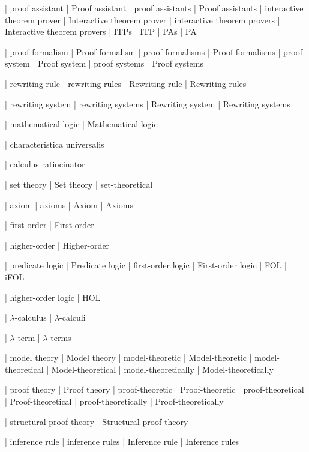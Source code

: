 
 | proof assistant
 | Proof assistant
 | proof assistants
 | Proof assistants
 | interactive theorem prover
 | Interactive theorem prover
 | interactive theorem provers
 | Interactive theorem provers
 | ITPs
 | ITP
 | PAs
 | PA

 | proof formalism
 | Proof formalism
 | proof formalisms
 | Proof formalisms
 | proof system
 | Proof system
 | proof systems
 | Proof systems

 | rewriting rule
 | rewriting rules
 | Rewriting rule
 | Rewriting rules

 | rewriting system
 | rewriting systems
 | Rewriting system
 | Rewriting systems

 | mathematical logic
 | Mathematical logic

 | characteristica universalis

 | calculus ratiocinator
 
 | set theory
 | Set theory
 | set-theoretical

 | axiom
 | axioms
 | Axiom
 | Axioms

 | first-order
 | First-order

 | higher-order
 | Higher-order

 | predicate logic
 | Predicate logic
 | first-order logic
 | First-order logic
 | FOL
 | iFOL
 
 | higher-order logic
 | HOL

 | $\lambda$-calculus
 | $\lambda$-calculi
 
 | $\lambda$-term
 | $\lambda$-terms

 | model theory
 | Model theory
 | model-theoretic
 | Model-theoretic
 | model-theoretical
 | Model-theoretical
 | model-theoretically
 | Model-theoretically

 | proof theory
 | Proof theory
 | proof-theoretic
 | Proof-theoretic
 | proof-theoretical
 | Proof-theoretical
 | proof-theoretically
 | Proof-theoretically

 | structural proof theory
 | Structural proof theory

 | inference rule
 | inference rules
 | Inference rule
 | Inference rules

